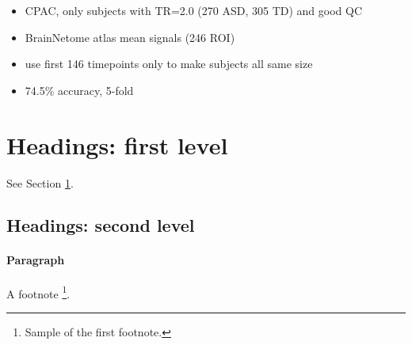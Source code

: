 \documentclass[10pt]{article}
\begin{document}
\begin{itemize}
  \item CPAC, only subjects with TR=2.0 (270 ASD, 305 TD) and good QC
  \item BrainNetome atlas mean signals (246 ROI)
  \item use first 146 timepoints only to make subjects all same size
  \item 74.5\% accuracy, 5-fold
\end{itemize}

\section{Headings: first level}
\label{sec:headings}

See Section \ref{sec:headings}.

\subsection{Headings: second level}
\paragraph{Paragraph}

A footnote \footnote{Sample of the first footnote.}.



\end{document}
